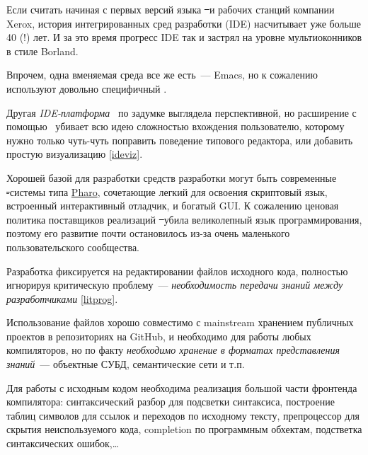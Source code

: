 \label{ide}\secdown


\clearpage
Если считать начиная с первых версий языка \st\ и рабочих станций компании
Xerox, история интегрированных сред разработки (IDE) насчитывает уже больше 40
(!) лет. И за это время прогресс IDE так и застрял на уровне мультиоконников
в стиле Borland.

Впрочем, одна вменяемая среда все же есть\ --- Emacs, но к
сожалению  используют довольно
специфичный \lisp.

Другая \emph{IDE-платформа} \eclipse\ по задумке выглядела перспективной, но
расширение с помощью \java\ убивает всю идею сложностью вхождения пользователю,
которому нужно только чуть-чуть поправить поведение типового редактора, или
добавить простую визуализацию \ref{ideviz}.

Хорошей базой для разработки средств разработки могут быть современные \st-системы типа
\href{https://pharo.org}{Pharo}, сочетающие легкий для освоения скриптовый язык,
встроенный интерактивный отладчик, и богатый GUI. К сожалению ценовая политика
поставщиков реализаций \st\ убила великолепный язык программирования, поэтому
его развитие почти остановилось из-за очень маленького пользовательского
сообщества.

\secdown


Разработка фиксируется на редактировании файлов исходного кода, полностью
игнорируя критическую проблему\ --- \emph{необходимость передачи знаний между
разработчиками} \ref{litprog}.

Использование файлов хорошо совместимо с mainstream хранением публичных проектов
в репозиториях на GitHub, и необходимо для работы любых компиляторов, но по
факту \emph{необходимо хранение в форматах представления знаний}\ --- объектные
СУБД, семантические сети и т.п.


Для работы с исходным кодом необходима реализация большой части фронтенда
компилятора: синтаксический разбор для подсветки синтаксиса, построение таблиц
символов для ссылок и переходов по исходному тексту, препроцессор для скрытия
неиспользуемого кода, completion по программным обхектам, подстветка
синтаксических ошибок,\ldots

